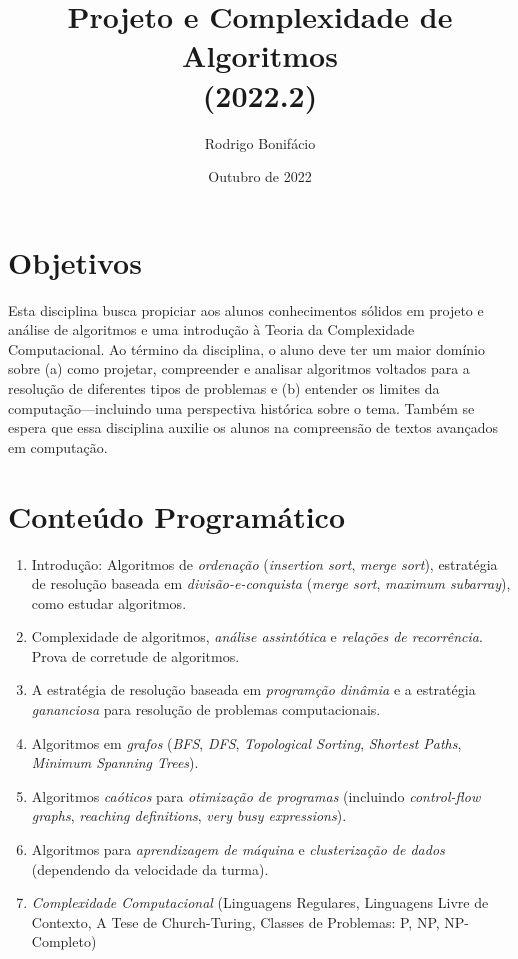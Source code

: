 \documentclass[11pt]{article}
\title{Projeto e Complexidade de Algoritmos \\ (2022.2)}
\author{Rodrigo Bonif\'{a}cio}
\date{Outubro de 2022}
\newcommand{\eng}[1]{\emph{#1}}
\newcommand{\hl}[1]{\emph{{\color{blue}#1}}}
\begin{document}
\maketitle

\section{Objetivos}

Esta disciplina busca propiciar aos alunos conhecimentos
s\'{o}lidos em projeto e an\'{a}lise de algoritmos e uma
introdu\c c\~{a}o \`{a} Teoria da Complexidade Computacional.
Ao t\'{e}rmino da disciplina, o aluno deve ter um maior
dom\'{i}nio sobre (a) como projetar, compreender e
analisar algoritmos voltados para a resolu\c c\~{a}o
de diferentes tipos de problemas e (b) entender
os limites da computa\c c\~{a}o---incluindo uma perspectiva hist\'{o}rica
sobre o tema. Tamb\'{e}m se espera que essa
disciplina auxilie os alunos na compreens\~{a}o
de textos avan\c cados em computa\c c\~{a}o.

\section{Conte\'{u}do Program\'{a}tico}

\begin{enumerate}[(M1)]
\item Introdu\c c\~{a}o: Algoritmos de \hl{ordena\c c\~{a}o} (\eng{insertion sort},
  \eng{merge sort}), estrat\'{e}gia de resolu\c c\~{a}o
  baseada em \hl{divis\~{a}o-e-conquista} (\eng{merge sort}, \eng{maximum subarray}),
  como estudar algoritmos.

\item Complexidade de algoritmos, \hl{an\'{a}lise assint\'{o}tica} e \hl{rela\c c\~{o}es de recorr\^{e}ncia}.
  Prova de corretude de algoritmos.

\item A estrat\'{e}gia de resolu\c c\~{a}o baseada em \hl{program\c c\~{a}o din\^{a}mia} e a
  estrat\'{e}gia \hl{gananciosa} para resolu\c c\~{a}o de problemas computacionais. 

\item Algoritmos em \hl{grafos} (\eng{BFS}, \eng{DFS}, \eng{Topological Sorting}, \eng{Shortest Paths},
  \eng{Minimum Spanning Trees}).

\item Algoritmos \hl{ca\'{o}ticos} para \hl{otimiza\c c\~{a}o de programas} (incluindo \eng{control-flow graphs},
  \eng{reaching definitions}, \eng{very busy expressions}).

\item Algoritmos para \hl{aprendizagem de m\'{a}quina} e \hl{clusteriza\c c\~{a}o de dados}
  (dependendo da velocidade da turma).   

\item \hl {Complexidade Computacional} (Linguagens Regulares, Linguagens Livre de Contexto,
 A Tese de Church-Turing, Classes de Problemas: P, NP, NP-Completo)   
  
\end{enumerate}
\end{document}
